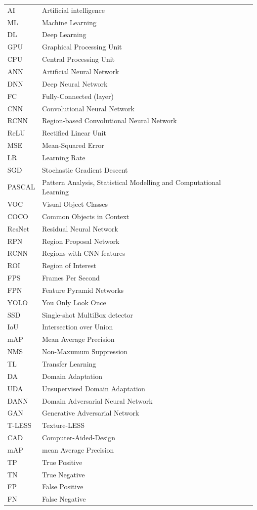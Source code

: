 \documentclass[english, 12pt, a4paper, elec, utf8, a-1b, online]{aaltothesis}
\begin{document}
\begin{tabular}{ll}
AI         & Artificial intelligence\\
ML         & Machine Learning\\
DL         & Deep Learning\\
GPU        & Graphical Processing Unit\\
CPU        & Central Processing Unit\\
ANN        & Artificial Neural Network\\
DNN        & Deep Neural Network\\
FC         & Fully-Connected (layer)\\
CNN        & Convolutional Neural Network\\
RCNN       & Region-based Convolutional Neural Network\\
ReLU       & Rectified Linear Unit\\
MSE        & Mean-Squared Error\\
LR 			&Learning Rate\\
SGD        & Stochastic Gradient Descent\\
PASCAL		& Pattern Analysis, Statistical Modelling and Computational Learning\\
VOC	 		& Visual Object Classes\\
COCO		& Common Objects in Context\\
ResNet		&Residual Neural Network\\
RPN			&Region Proposal Network\\
RCNN		&Regions with CNN features\\
ROI			&Region of Interest\\
FPS			&Frames Per Second\\
FPN			&Feature Pyramid Networks\\
YOLO		&You Only Look Once \\
SSD			&Single-shot MultiBox detector\\
IoU 		&Intersection over Union\\
mAP			&Mean Average Precision\\
NMS			&Non-Maxumum Suppression\\
TL			&Transfer Learning\\
DA			&Domain Adaptation\\
UDA			&Unsupervised Domain Adaptation\\
DANN		&Domain Adversarial Neural Network  \\
GAN			&Generative Adversarial Network\\
T-LESS		&Texture-LESS\\
CAD 		&Computer-Aided-Design\\
mAP			&mean Average Precision\\
TP			&True Positive\\
TN			&True Negative\\
FP			&False Positive\\
FN			&False Negative\\
\end{tabular}
\end{document}
